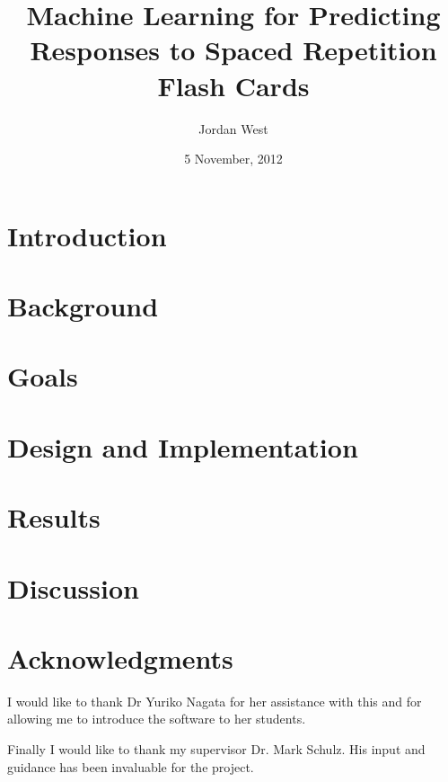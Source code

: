 \documentclass[a4paper]{article}
\title{Machine Learning for Predicting Responses to Spaced Repetition Flash Cards}
\date{5 November, 2012}
\author{Jordan West}
\begin{document}


\tableofcontents
\newpage

\section{Introduction}


\section{Background} \label{background}

\section{Goals}

\section{Design and Implementation}

\section{Results}

\section{Discussion}





\section{Acknowledgments}
I would like to thank Dr Yuriko Nagata for her assistance with this and for allowing
me to introduce the software to her students.

Finally I would like to thank my supervisor Dr. Mark Schulz. His input and guidance
has been invaluable for the project. 
\end{document}
